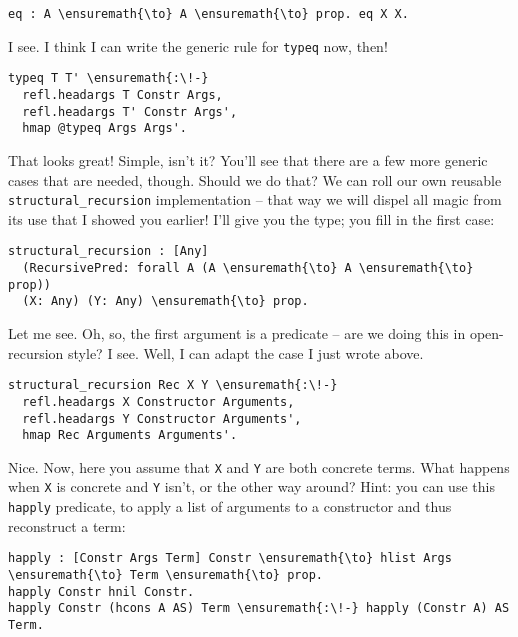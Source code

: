 \begin{verbatim}
eq : A \ensuremath{\to} A \ensuremath{\to} prop. eq X X.
\end{verbatim}

\heroSTUDENT{} I see. I think I can write the generic rule for \texttt{typeq}
now, then!

\begin{verbatim}
typeq T T' \ensuremath{:\!-}
  refl.headargs T Constr Args,
  refl.headargs T' Constr Args',
  hmap @typeq Args Args'.
\end{verbatim}

\heroADVISOR{} That looks great! Simple, isn't it? You'll see that there are a
few more generic cases that are needed, though. Should we do that? We
can roll our own reusable \texttt{structural\_recursion} implementation
-- that way we will dispel all magic from its use that I showed you
earlier! I'll give you the type; you fill in the first case:

\importantCodeblock{}

\begin{verbatim}
structural_recursion : [Any] 
  (RecursivePred: forall A (A \ensuremath{\to} A \ensuremath{\to} prop))
  (X: Any) (Y: Any) \ensuremath{\to} prop.
\end{verbatim}

\importantCodeblockEnd{}

\heroSTUDENT{} Let me see. Oh, so, the first argument is a predicate -- are we
doing this in open-recursion style? I see. Well, I can adapt the case I
just wrote above.

\begin{verbatim}
structural_recursion Rec X Y \ensuremath{:\!-}
  refl.headargs X Constructor Arguments,
  refl.headargs Y Constructor Arguments',
  hmap Rec Arguments Arguments'.
\end{verbatim}

\heroADVISOR{} Nice. Now, here you assume that \texttt{X} and \texttt{Y} are
both concrete terms. What happens when \texttt{X} is concrete and
\texttt{Y} isn't, or the other way around? Hint: you can use this
\texttt{happly} predicate, to apply a list of arguments to a constructor
and thus reconstruct a term:

\begin{verbatim}
happly : [Constr Args Term] Constr \ensuremath{\to} hlist Args \ensuremath{\to} Term \ensuremath{\to} prop.
happly Constr hnil Constr.
happly Constr (hcons A AS) Term \ensuremath{:\!-} happly (Constr A) AS Term.
\end{verbatim}

